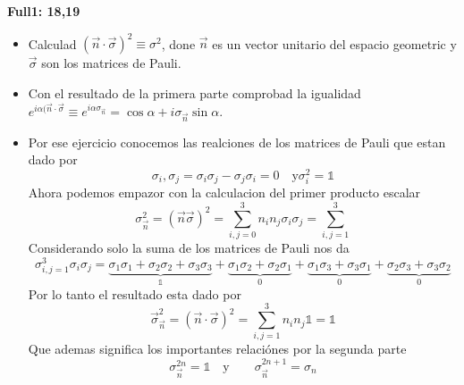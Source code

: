 \begin{ejercicio}
\textbf{Full1: 18,19}
\begin{itemize}
\item 	Calculad $(\vec n \cdot \vec \sigma)^2 \equiv \sigma^2$, done $\vec n$ es un
vector unitario del espacio geometric y $\vec \sigma$ son los matrices de Pauli. 
\item	Con el resultado de la primera parte comprobad la igualidad
$e^{i\alpha(\vec n \cdot \vec \sigma} \equiv e^{i\alpha \sigma_{\vec n}} = \cos
\alpha + i \sigma_{\vec n} \sin \alpha$.
\end{itemize}
\end{ejercicio}
\begin{solucion}
\begin{itemize}
\item	
Por ese ejercicio conocemos las realciones de los matrices de Pauli que estan
dado por
$$
	{\sigma_i, \sigma_j} = \sigma_i \sigma_j - \sigma_j \sigma_i = 0 \quad
\text{y} \sigma_i^2 = \mathds{1}	
$$
Ahora podemos empazor con la calculacion del primer producto escalar
$$
	\sigma_{\vec n}^2 = (\vec n \vec \sigma)^2 = \sum_{i, j=0}^3 n_i n_j
\sigma_i \sigma_j = \sum_{i,j =1}^3 
$$
Considerando solo la suma de los matrices de Pauli nos da
$$
	\sigma_{i,j=1}^3 \sigma_i \sigma_j = \underbrace{\sigma_1 \sigma_1 + \sigma_2 \sigma_2
+ \sigma_3 \sigma_3}_{\mathds{1}} + \underbrace{\sigma_1 \sigma_2 +
\sigma_2\sigma_1}_0 + \underbrace{\sigma_1 \sigma_3 + \sigma_3 \sigma_1}_0 +
\underbrace{\sigma_2 \sigma_3 + \sigma_3 \sigma_2}_0
$$
Por lo tanto el resultado esta dado por
$$
	\vec \sigma_{\vec n}^2 = (\vec n \cdot \vec \sigma)^2 = \sum_{i,j = 1}^3 n_i
n_j \mathds{1} = \mathds{1} 
$$
Que ademas significa los importantes relaciónes por la segunda parte
$$
	\sigma_{\vec n}^{2n} = \mathds{1} \quad \text{y} \qquad \sigma_{\vec
n}^{2n+1} = \sigma_{n}
$$


\end{itemize}
\end{solucion}
